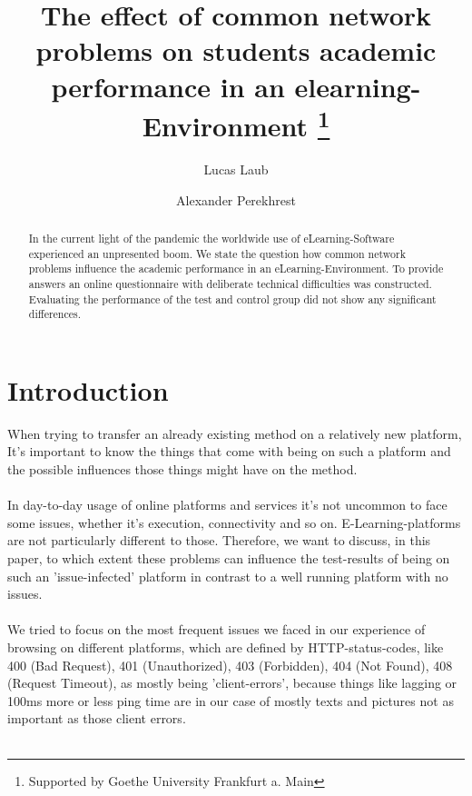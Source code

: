 \documentclass[12pt, a4paper]{article}
\begin{document}
\title{The effect of common network problems on students academic performance in an elearning-Environment \thanks{Supported by Goethe University Frankfurt a. Main}}

\author{Lucas Laub  \and
Alexander Perekhrest }


\maketitle

\begin{abstract}
In the current light of the pandemic the worldwide use
of eLearning-Software experienced an unpresented boom.
We state the question how common network problems influence
the academic performance in an eLearning-Environment.
To provide answers an online questionnaire with deliberate
technical difficulties was constructed. Evaluating the performance
of the test and control group did not show any significant
differences.
\end{abstract}


\section{Introduction}
When trying to transfer an already existing method on a relatively new platform, 
It's important to know the things that come with being on such a platform and the 
possible influences those things might have on the method.\\\\
In day-to-day usage of online platforms and services it's not uncommon to face some 
issues, whether it's execution, connectivity and so on. E-Learning-platforms are not 
particularly different to those. Therefore, we want to discuss, in this paper, to 
which extent these problems can influence the test-results of being on such an 
'issue-infected' platform in contrast to a well running platform with no issues.\\\\
We tried to focus on the most frequent issues we faced in our experience of browsing 
on different platforms, which are defined by HTTP-status-codes, like 400 (Bad Request), 401 
(Unauthorized), 403 (Forbidden), 404 (Not Found), 408 (Request Timeout), as mostly being 'client-errors', because things like lagging or 100ms more or less ping time are in our case of mostly texts and pictures not as important as those client errors.\\\\
\end{document}
